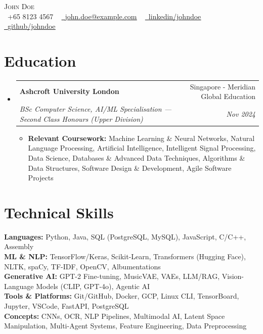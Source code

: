\documentclass[letterpaper,10pt]{article}
\makeatletter
\newcommand{\resumeItem}[1]{\item\small{{#1\vspace{-3pt}}}}
\newcommand{\resumeSubheading}[4]{
  \vspace{-1pt}\item
    \begin{tabular*}{0.98\textwidth}[t]{l@{\extracolsep{\fill}}r}
      \textbf{#1} & #2 \\
      \textit{\small#3} & \textit{\small #4} \\
    \end{tabular*}\vspace{-5pt}
}
\newcommand{\resumeSubHeadingListStart}{\begin{itemize}[leftmargin=0.05in, rightmargin=0in, label={}]}
\newcommand{\resumeSubHeadingListEnd}{\end{itemize}}
\newcommand{\resumeItemListStart}{\begin{itemize}[leftmargin=0.15in, rightmargin=0.05in]\vspace{-2pt}}
\newcommand{\resumeItemListEnd}{\end{itemize}\vspace{-6pt}}
\makeatother
\begin{document}
\begin{center}
    {\huge \scshape John Doe} \\ \vspace{5.0pt}\small
 \raisebox{-0.1\height} \faPhone\ +65 8123 4567 ~
 \href{mailto:john.doe@example.com}
 {\raisebox{-0.1\height}\faEnvelopeO\  \underline{john.doe@example.com}} ~
\href{https://linkedin.com/in/johndoe/}{\raisebox{-0.1\height}\faLinkedinSquare\ \underline{linkedin/johndoe}} ~
\href{https://github.com/johndoe}{\raisebox{-0.1\height}\faGithub\ \underline{github/johndoe}} ~
\end{center}

\section{Education}
  \resumeSubHeadingListStart
    \resumeSubheading
      {Ashcroft University London}{Singapore - Meridian Global Education}
      {BSc Computer Science, AI/ML Specialisation \textnormal{---} Second Class Honours (Upper Division)}{Nov 2024}
      \resumeItemListStart
      \vspace{2pt}
        \resumeItem{\textbf{Relevant Coursework:} Machine Learning \& Neural Networks, Natural Language Processing, Artificial Intelligence, Intelligent Signal Processing, Data Science, Databases \& Advanced Data Techniques, Algorithms \& Data Structures, Software Design \& Development, Agile Software Projects}
      \resumeItemListEnd
  \resumeSubHeadingListEnd

\section{Technical Skills}
 \begin{itemize}[leftmargin=0.05in, label={}]
    \small{\item{
     \textbf{Languages:}{ Python, Java, SQL (PostgreSQL, MySQL), JavaScript, C/C++, Assembly} \\
     \textbf{ML \& NLP:}{ TensorFlow/Keras, Scikit-Learn, Transformers (Hugging Face), NLTK, spaCy, TF-IDF, OpenCV, Albumentations} \\
     \textbf{Generative AI:}{ GPT-2 Fine-tuning, MusicVAE, VAEs, LLM/RAG, Vision-Language Models (CLIP, GPT-4o), Agentic AI} \\
     \textbf{Tools \& Platforms:}{ Git/GitHub, Docker, GCP, Linux CLI, TensorBoard, Jupyter, VSCode, FastAPI, PostgreSQL} \\
     \textbf{Concepts:}{ CNNs, OCR, NLP Pipelines, Multimodal AI, Latent Space Manipulation, Multi-Agent Systems, Feature Engineering, Data Preprocessing}}}
     \vspace{-4pt}
  \end{itemize}
\end{document}
